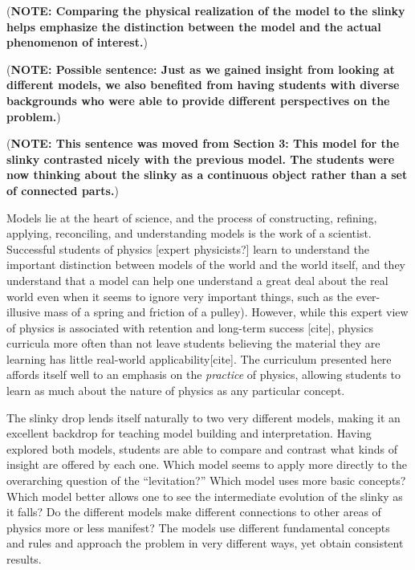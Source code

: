 \documentclass[prb,preprint,superscriptaddress]{revtex4-1}
\newcommand{\NOTE}[1]{\marginpar{\footnotesize\textbf{NOTE}} (\textbf{NOTE: #1})}
\begin{document}
\NOTE{Comparing the physical realization of the model to the slinky 
helps emphasize the distinction between the model and the actual phenomenon of interest.}

\NOTE{Possible sentence: Just as we gained insight from looking at different models, we also benefited from
having students with diverse backgrounds who were able to provide different
perspectives on the problem.}

\NOTE{This sentence was moved from Section 3: This model for the slinky contrasted nicely with the previous model. The students were now thinking about
the slinky as a continuous object rather than a set of connected parts.}

Models lie at the heart of science, and the process of constructing, refining, applying, reconciling, and understanding models is the work of a scientist. Successful students of physics [expert physicists?] learn to understand the important distinction between models of the world and the world itself, and they understand that a model can help one understand a great deal about the real world even when it seems to ignore very important things, such as the ever-illusive mass of a spring and friction of a pulley). However, while this expert view of physics is associated with retention and long-term success [cite], physics curricula more often than not leave students believing the material they are learning has little real-world applicability[cite]. The curriculum presented here affords itself well to an emphasis on the \emph{practice} of physics, allowing students to learn as much about the nature of physics as any particular concept.

The slinky drop lends itself naturally to two very different models,
making it an excellent backdrop for teaching model building and interpretation. Having explored both
models, students are able to compare and contrast what kinds of insight are
offered by each one. Which model seems to apply more directly to the overarching
question of the ``levitation?'' Which model uses more basic concepts? Which model
better allows one to see the intermediate evolution of the slinky as it falls? Do the different models make different connections to other areas of physics more or less manifest?
The models use different fundamental concepts and rules and approach
the problem in very different ways, yet obtain consistent results.
\end{document}
